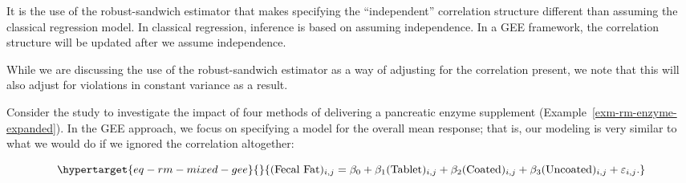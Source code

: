 \documentclass[
  letterpaper,
  DIV=11,
  numbers=noendperiod]{scrreprt}
\theoremstyle{definition}
\theoremstyle{definition}
\theoremstyle{remark}
\begin{document}
\begin{tcolorbox}[enhanced jigsaw, left=2mm, toprule=.15mm, arc=.35mm, breakable, opacitybacktitle=0.6, opacityback=0, rightrule=.15mm, colbacktitle=quarto-callout-note-color!10!white, coltitle=black, leftrule=.75mm, toptitle=1mm, colframe=quarto-callout-note-color-frame, titlerule=0mm, title=\textcolor{quarto-callout-note-color}{\faInfo}\hspace{0.5em}{Note}, bottomrule=.15mm, colback=white, bottomtitle=1mm]

It is the use of the robust-sandwich estimator that makes specifying the
``independent'' correlation structure different than assuming the
classical regression model. In classical regression, inference is based
on assuming independence. In a GEE framework, the correlation structure
will be updated after we assume independence.

\end{tcolorbox}

\begin{tcolorbox}[enhanced jigsaw, left=2mm, toprule=.15mm, arc=.35mm, breakable, opacitybacktitle=0.6, opacityback=0, rightrule=.15mm, colbacktitle=quarto-callout-note-color!10!white, coltitle=black, leftrule=.75mm, toptitle=1mm, colframe=quarto-callout-note-color-frame, titlerule=0mm, title=\textcolor{quarto-callout-note-color}{\faInfo}\hspace{0.5em}{Note}, bottomrule=.15mm, colback=white, bottomtitle=1mm]

While we are discussing the use of the robust-sandwich estimator as a
way of adjusting for the correlation present, we note that this will
also adjust for violations in constant variance as a result.

\end{tcolorbox}

Consider the study to investigate the impact of four methods of
delivering a pancreatic enzyme supplement
(Example~\ref{exm-rm-enzyme-expanded}). In the GEE approach, we focus on
specifying a model for the overall mean response; that is, our modeling
is very similar to what we would do if we ignored the correlation
altogether:

\begin{equation}\protect\hypertarget{eq-rm-mixed-gee}{}{(\text{Fecal Fat})_{i,j} = \beta_0 + \beta_1 (\text{Tablet})_{i,j} + \beta_2 (\text{Coated})_{i,j} + \beta_3 (\text{Uncoated})_{i,j} + \varepsilon_{i,j}.}\label{eq-rm-mixed-gee}\end{equation}
\end{document}
